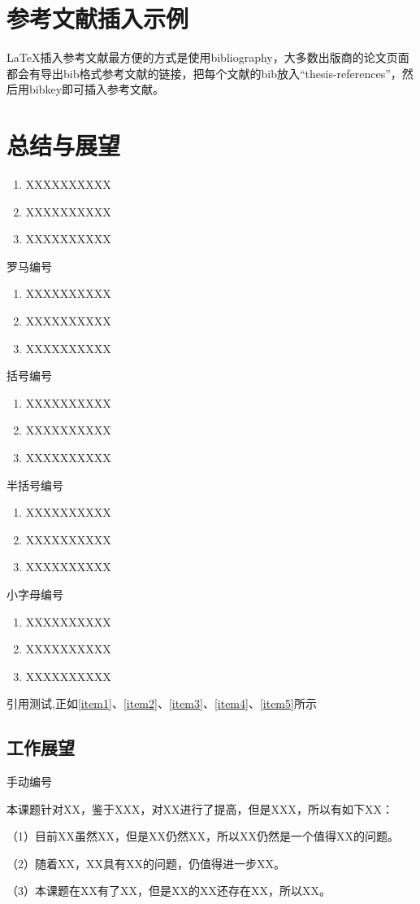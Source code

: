 \newpage

\section{参考文献插入示例}

LaTeX\cite{lamport1994latex}插入参考文献最方便的方式是使用bibliography\cite{pritchard1969statistical}，大多数出版商的论文页面都会有导出bib格式参考文献的链接，把每个文献的bib放入``thesis-references''，然后用bibkey即可插入参考文献。

\lipsum

\newpage


\section{总结与展望}

\begin{enumerate}
 \item XXXXXXXXXX
 \label{item1}
 \item XXXXXXXXXX
 \item XXXXXXXXXX
\end{enumerate}
罗马编号
\begin{enumerate}[label=(\roman*)]
 \item XXXXXXXXXX
 \label{item2}
 \item XXXXXXXXXX
 \item XXXXXXXXXX
\end{enumerate}
括号编号
\begin{enumerate}[label=(\arabic*)]
 \item XXXXXXXXXX
 \label{item3}
 \item XXXXXXXXXX
 \item XXXXXXXXXX
\end{enumerate}
半括号编号
\begin{enumerate}[label=\arabic*)]
 \item XXXXXXXXXX
 \label{item4}
 \item XXXXXXXXXX
 \item XXXXXXXXXX
\end{enumerate}
小字母编号
\begin{enumerate}[label=\alph*)]
 \item XXXXXXXXXX
 \label{item5}
 \item XXXXXXXXXX
 \item XXXXXXXXXX
\end{enumerate}

引用测试,正如\ref{item1}、\ref{item2}、\ref{item3}、\ref{item4}、\ref{item5}所示

\subsection{工作展望}
手动编号 %
\par
本课题针对XX，鉴于XXX，对XX进行了提高，但是XXX，所以有如下XX：

（1）目前XX虽然XX，但是XX仍然XX，所以XX仍然是一个值得XX的问题。

（2）随着XX，XX具有XX的问题，仍值得进一步XX。

（3）本课题在XX有了XX，但是XX的XX还存在XX，所以XX。


\newpage
